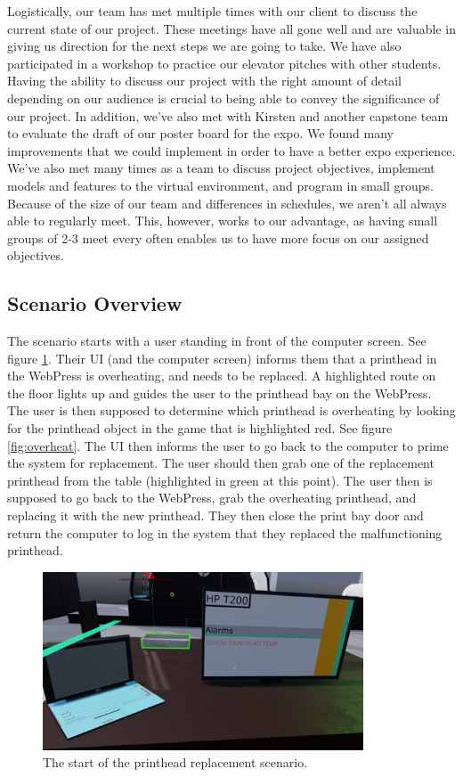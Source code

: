 \documentclass[onecolumn, draftclsnofoot,10pt, compsoc]{IEEEtran}
\begin{document}
Logistically, our team has met multiple times with our client to discuss the current state of our project. These meetings have all gone well and are valuable in giving us direction for the next steps we are going to take. We have also participated in a workshop to practice our elevator pitches with other students. Having the ability to discuss our project with the right amount of detail depending on our audience is crucial to being able to convey the significance of our project. In addition, we've also met with Kirsten and another capstone team to evaluate the draft of our poster board for the expo. We found many improvements that we could implement in order to have a better expo experience. We've also met many times as a team to discuss project objectives, implement models and features to the virtual environment, and program in small groups. Because of the size of our team and differences in schedules, we aren't all always able to regularly meet. This, however, works to our advantage, as having small groups of 2-3 meet every often enables us to have more focus on our assigned objectives. 
\newpage

\subsection{Scenario Overview}

 The scenario starts with a user standing in front of the computer screen. See figure \ref{fig:screen}.  Their UI (and the computer screen) informs them that a printhead in the WebPress is overheating, and needs to be replaced. A highlighted route on the floor lights up and guides the user to the printhead bay on the WebPress. The user is then supposed to determine which printhead is overheating by looking for the printhead object in the game that is highlighted red. See figure \ref{fig:overheat}. The UI then informs the user to go back to the computer to prime the system for replacement. The user should then grab one of the replacement printhead from the table (highlighted in green at this point). The user then is supposed to go back to the WebPress, grab the overheating printhead, and replacing it with the new printhead. They then close the print bay door and return the computer to log in the system that they replaced the malfunctioning printhead.
 
 \begin{figure}[ht!]
     \centering
     \includegraphics[width=0.85\textwidth]{1.png}
     \caption{The start of the printhead replacement scenario.}
     \label{fig:screen}
 \end{figure}
 
\end{document}
